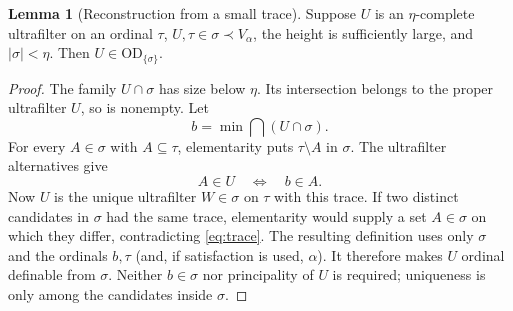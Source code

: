 \documentclass[11pt,letterpaper]{article}
\theoremstyle{definition}
\newtheorem{lemma}[definition]{Lemma}
\numberwithin{equation}{section}
\newcommand{\OD}{\mathrm{OD}}
\begin{document}
\begin{lemma}[Reconstruction from a small trace]\label{lem:trace}
Suppose $U$ is an $\eta$-complete ultrafilter on an ordinal $\tau$,
$U,\tau\in\sigma\prec V_\alpha$, the height is sufficiently large,
and $|\sigma|<\eta$. Then $U\in\OD_{\{\sigma\}}$.
\end{lemma}
\begin{proof}
The family $U\cap\sigma$ has size below $\eta$. Its intersection belongs
to the proper ultrafilter $U$, so is nonempty. Let
\[
b=\min\bigcap(U\cap\sigma).
\]
For every $A\in\sigma$ with $A\subseteq\tau$, elementarity puts
$\tau\setminus A$ in $\sigma$. The ultrafilter alternatives give
\begin{equation}\label{eq:trace}
A\in U\quad\Longleftrightarrow\quad b\in A.
\end{equation}
Now $U$ is the unique ultrafilter $W\in\sigma$ on $\tau$ with this
trace. If two distinct candidates in $\sigma$ had the same trace,
elementarity would supply a set $A\in\sigma$ on which they differ,
contradicting \eqref{eq:trace}. The resulting definition uses only
$\sigma$ and the ordinals $b,\tau$ (and, if satisfaction is used,
$\alpha$). It therefore makes $U$ ordinal definable from $\sigma$.
Neither $b\in\sigma$ nor principality of $U$ is required; uniqueness
is only among the candidates inside $\sigma$.
\end{proof}
\end{document}
